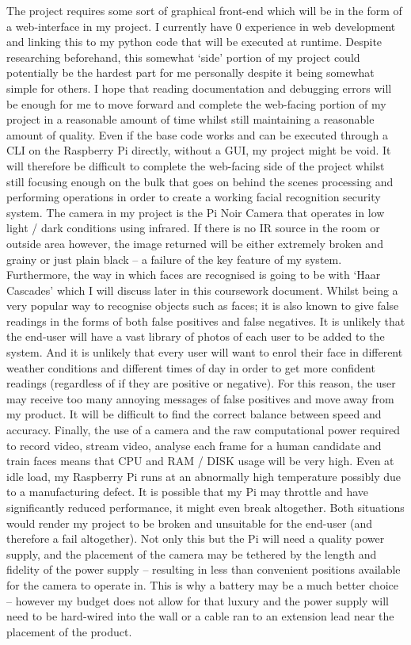 \documentclass[9pt]{article}
\begin{document}
The project requires some sort of graphical front-end which will be in the form of a web-interface in my project. I currently have 0 experience in web development and linking this to my python code that will be executed at runtime. Despite researching beforehand, this somewhat ‘side’ portion of my project could potentially be the hardest part for me personally despite it being somewhat simple for others. I hope that reading documentation and debugging errors will be enough for me to move forward and complete the web-facing portion of my project in a reasonable amount of time whilst still maintaining a reasonable amount of quality. Even if the base code works and can be executed through a CLI on the Raspberry Pi directly, without a GUI, my project might be void. It will therefore be difficult to complete the web-facing side of the project whilst still focusing enough on the bulk that goes on behind the scenes processing and performing operations in order to create a working facial recognition security system.
The camera in my project is the Pi Noir Camera that operates in low light / dark conditions using infrared. If there is no IR source in the room or outside area however, the image returned will be either extremely broken and grainy or just plain black – a failure of the key feature of my system. Furthermore, the way in which faces are recognised is going to be with ‘Haar Cascades’ which I will discuss later in this coursework document. Whilst being a very popular way to recognise objects such as faces; it is also known to give false readings in the forms of both false positives and false negatives. It is unlikely that the end-user will have a vast library of photos of each user to be added to the system. And it is unlikely that every user will want to enrol their face in different weather conditions and different times of day in order to get more confident readings (regardless of if they are positive or negative). For this reason, the user may receive too many annoying messages of false positives and move away from my product. It will be difficult to find the correct balance between speed and accuracy.
Finally, the use of a camera and the raw computational power required to record video, stream video, analyse each frame for a human candidate and train faces means that CPU and RAM / DISK usage will be very high. Even at idle load, my Raspberry Pi runs at an abnormally high temperature possibly due to a manufacturing defect. It is possible that my Pi may throttle and have significantly reduced performance, it might even break altogether. Both situations would render my project to be broken and unsuitable for the end-user (and therefore a fail altogether). Not only this but the Pi will need a quality power supply, and the placement of the camera may be tethered by the length and fidelity of the power supply – resulting in less than convenient positions available for the camera to operate in. This is why a battery may be a much better choice – however my budget does not allow for that luxury and the power supply will need to be hard-wired into the wall or a cable ran to an extension lead near the placement of the product.
\end{document}
